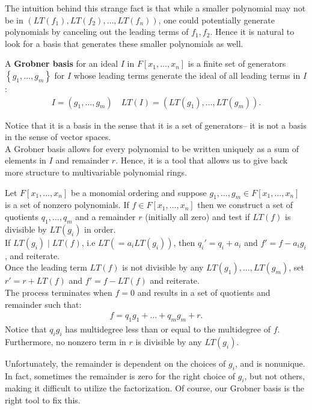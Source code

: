 \documentclass{memoir}
\begin{document}
\begin{exmp}
	
\end{exmp}
The intuition behind this strange fact is that while a smaller polynomial may not be in \((LT(f_1),LT(f_2),\ldots,LT(f_n))\), one could potentially generate polynomials by canceling out the leading terms of \(f_1,f_2\). Hence it is natural to look for a basis that generates these smaller polynomials as well.

\begin{defn}
	A \textbf{Grobner basis} for an ideal \(I\) in \(F[x_1,\ldots,x_n]\) is a finite set of generators \(\left\{ g_1,\ldots,g_m \right\} \) for \(I\) whose leading terms generate the ideal of all leading terms in \(I\):
	\begin{align*}
		I = (g_1,\ldots,g_m) \quad LT(I) = (LT(g_1),\ldots,LT(g_m)).
	\end{align*}
\end{defn}
Notice that it is a basis in the sense that it is a set of generators-- it is not a basis in the sense of vector spaces.\\

A Grobner basis allows for every polynomial to be written uniquely as a sum of elements in \(I\) and remainder \(r\). Hence, it is a tool that allows us to give back more structure to multivariable polynomial rings.

\begin{general}
	Let \(F[x_1,\ldots,x_n]\) be a monomial ordering and suppose \(g_1,\ldots,g_m \in F[x_1,\ldots,x_n]\) is a set of nonzero polynomials. If \(f \in F[x_1,\ldots,x_n]\) then we construct a set of quotients \(q_1,\ldots,q_m\) and a remainder \(r\) (initially all zero) and test if \(LT(f)\) is divisible by \(LT(g_i)\) in order.\\

	If \(LT(g_i)\mid LT(f)\), i.e \(LT\left(  = a_iLT(g_i) \right) \), then \(q_i' = q_i+a_i\) and \(f' = f-a_ig_i\), and reiterate.\\

	Once the leading term  \(LT(f)\) is not divisible by any \(LT(g_1),\ldots,LT(g_m)\), set \(r' = r+LT(f)\) and \(f' = f-LT(f)\) and reiterate.\\

	The process terminates when \(f = 0\) and results in a set of quotients and remainder such that:
	\begin{align*}
		f = q_1g_1 + \ldots + q_mg_m + r.
	\end{align*}
	Notice that \(q_ig_i\) has multidegree less than or equal to the multidegree of \(f\). Furthermore, no nonzero term in \(r\) is divisible by any \(LT(g_i)\).
\end{general}
Unfortunately, the remainder is dependent on the choices of \(g_i\), and is nonunique. In fact, sometimes the remainder is zero for the right choice of \(g_i\), but not others, making it difficult to utilize the factorization. Of course, our Grobner basis is the right tool to fix this.
\end{document}
